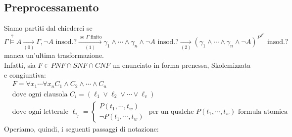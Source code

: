 \subsection{Preprocessamento}
Siamo partiti dal chiederci se 
$$
\Gamma \stackrel ? \models A
\xrightarrow[(0)]{} \Gamma, \neg A \text{ insod.?}
\xrightarrow[(1)] {\text{ se } \Gamma \text{ finito}} \gamma_1 \land \cdots \land \gamma_n \land \neg A \text{ insod.?}
\xrightarrow[(2)]{} (\gamma_1 \land \cdots \land \gamma_n \land \neg A)^{P^{S^C}} \text{ insod.?}
$$
manca un'ultima trasformazione. \\
Infatti, sia $F \in PNF \cap SNF \cap CNF$  un enunciato in forma prenessa, Skolemizzata 
e congiuntiva:
\begin{align*}
& F = \forall x_1 \cdots \forall x_n C_1 \land C_2 \land \cdots \land C_u \\
& \text{dove ogni clausola } C_i = (\ell_1 \lor \ell_2 \lor \cdots \lor \ell_v) \\
& \text{dove ogni letterale } \ell_{i_j} =
  \begin{cases}
    P(t_1, \cdots, t_w) \\
    \neg P(t_1, \cdots, t_w)
  \end{cases}
  \text{ per un qualche } P(t_1, \cdots, t_w) \text{ formula atomica}
\end{align*}
Operiamo, quindi, i seguenti passaggi di notazione: 
